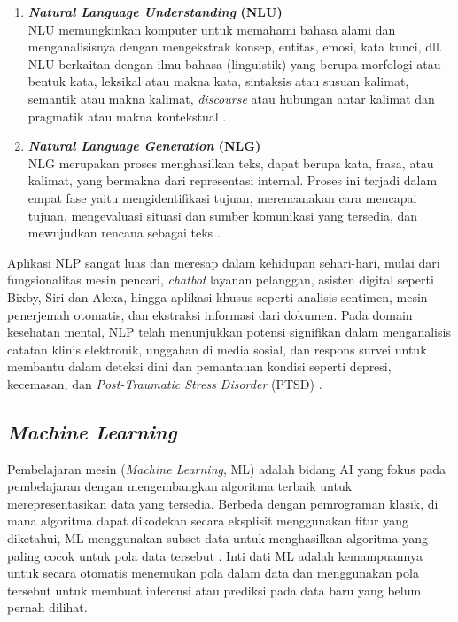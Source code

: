 \begin{enumerate}
	\item \textbf{\textit{Natural Language Understanding} (NLU)} \\
	      NLU memungkinkan komputer untuk memahami bahasa alami dan menganalisisnya dengan mengekstrak konsep, entitas, emosi, kata kunci, dll.
	      NLU berkaitan dengan ilmu bahasa (linguistik) yang berupa morfologi atau bentuk kata, leksikal atau makna kata, sintaksis atau susuan kalimat, semantik atau makna kalimat, \textit{discourse} atau hubungan antar kalimat dan pragmatik atau makna kontekstual \cite{Khurana2022AboutNLP}.
	\item \textbf{\textit{Natural Language Generation} (NLG)} \\
	      NLG merupakan proses menghasilkan teks, dapat berupa kata, frasa, atau kalimat, yang bermakna dari representasi internal.
	      Proses ini terjadi dalam empat fase yaitu mengidentifikasi tujuan, merencanakan cara mencapai tujuan, mengevaluasi situasi dan sumber komunikasi yang tersedia, dan mewujudkan rencana sebagai teks \cite{Khurana2022AboutNLP}.
\end{enumerate}

Aplikasi NLP sangat luas dan meresap dalam kehidupan sehari-hari, mulai dari fungsionalitas mesin pencari, \textit{chatbot} layanan pelanggan, asisten digital seperti Bixby, Siri dan Alexa, hingga aplikasi khusus seperti analisis sentimen, mesin penerjemah otomatis, dan ekstraksi informasi dari dokumen.
Pada domain kesehatan mental, NLP telah menunjukkan potensi signifikan dalam menganalisis catatan klinis elektronik, unggahan di media sosial, dan respons survei untuk membantu dalam deteksi dini dan pemantauan kondisi seperti depresi, kecemasan, dan \textit{Post-Traumatic Stress Disorder} (PTSD) \cite{NLPonMentalHealth}.

\subsection{\textit{Machine Learning}}
Pembelajaran mesin (\textit{Machine Learning}, ML) adalah bidang AI yang fokus pada pembelajaran dengan mengembangkan algoritma terbaik untuk merepresentasikan data yang tersedia.
Berbeda dengan pemrograman klasik, di mana algoritma dapat dikodekan secara eksplisit menggunakan fitur yang diketahui,
ML menggunakan subset data untuk menghasilkan algoritma yang paling cocok untuk pola data tersebut \cite{choi2020IntroductionML_NN_DL}.
Inti dati ML adalah kemampuannya untuk secara otomatis menemukan pola dalam data dan menggunakan pola tersebut untuk membuat inferensi atau prediksi pada data baru yang belum pernah dilihat.


